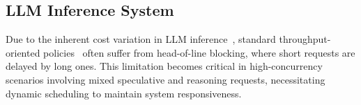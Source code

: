 \subsection{LLM Inference System}
Due to the inherent cost variation in LLM inference~\cite{inferencesurvey}, standard throughput-oriented policies~\cite{vllm,orca} often suffer from head-of-line blocking, where short requests are delayed by long ones. 
This limitation becomes critical in high-concurrency scenarios involving mixed speculative and reasoning requests, necessitating dynamic scheduling to maintain system responsiveness.


